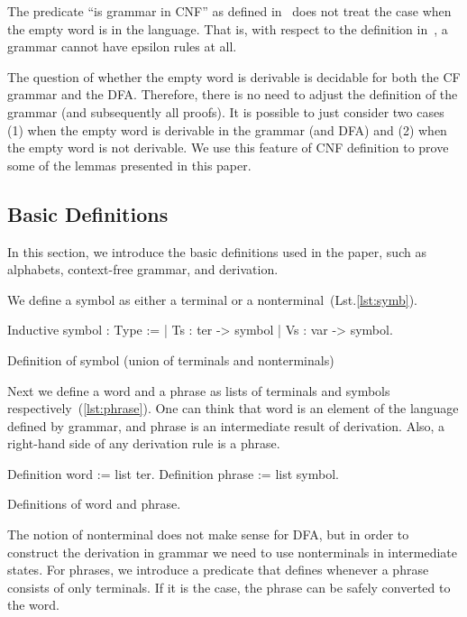 The predicate ``is grammar in CNF'' as defined in~\cite{smolkaHofmann2016} does not treat the case when the empty word is in the language. That is, with respect to the definition in~\cite{smolkaHofmann2016}, a grammar cannot have epsilon rules at all.

The question of whether the empty word is derivable is decidable for both the CF grammar and the DFA. Therefore, there is no need to adjust the definition of the grammar (and subsequently all proofs). It is possible to just consider two cases (1) when the empty word is derivable in the grammar (and DFA) and (2) when the empty word is not derivable. We use this feature of CNF definition to prove some of the lemmas presented in this paper.

\subsection{Basic Definitions}

In this section, we introduce the basic definitions used in the paper, such as alphabets, context-free grammar, and derivation.

We define a symbol as either a terminal or a nonterminal~(Lst.\ref{lst:symb}).

\begin{listing}[h]
    \begin{pyglist}[language=coq, numbers=none, numbersep=5pt]
  Inductive symbol : Type :=
    | Ts : ter -> symbol
    | Vs : var -> symbol.
    \end{pyglist}
    \caption{Definition of symbol (union of terminals and nonterminals)}
    \label{lst:symb}
\end{listing}

Next we define a word and a phrase as lists of terminals and symbols respectively~(\ref{lst:phrase}).
One can think that word is an element of the language defined by grammar, and phrase is an intermediate result of derivation.
Also, a right-hand side of any derivation rule is a phrase.

\begin{listing}[h]
    \begin{pyglist}[language=coq, numbers=none, numbersep=5pt]
  Definition word := list ter.
  Definition phrase := list symbol.
    \end{pyglist}
    \caption{Definitions of word and phrase.}
    \label{lst:phrase}
\end{listing}

The notion of nonterminal does not make sense for DFA, but in order to construct the derivation in grammar we need to use nonterminals in intermediate states. For phrases, we introduce a predicate that defines whenever a phrase consists of only terminals. If it is the case, the phrase can be safely converted to the word.

